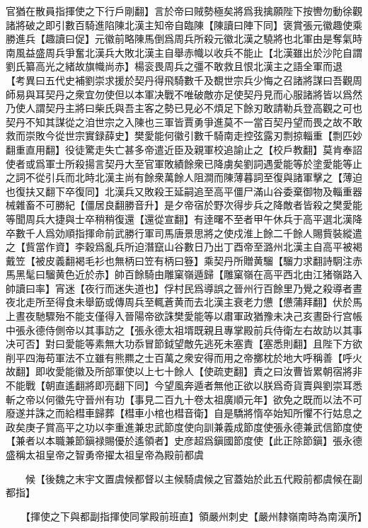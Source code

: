 官猶在散員指揮使之下行戶剛翻】言於帝曰賊勢極矣將爲我擒願陛下按轡勿動徐觀諸將破之即引數百騎進陷陳北漢主知帝自臨陳【陳讀曰陣下同】褒賞張元徽趣使乘勝進兵【趣讀曰促】元徽前略陳馬倒爲周兵所殺元徽北漢之驍將也北軍由是奪氣時南風益盛周兵爭奮北漢兵大敗北漢主自舉赤幟以收兵不能止【北漢雖出於沙陀自謂劉氏纂高光之緒故旗幟尚赤】楊衮畏周兵之彊不敢救且恨北漢主之語全軍而退　【考異曰五代史補劉崇求援於契丹得飛騎數千及覩世宗兵少悔之召諸將謀曰吾觀周師易與耳契丹之衆宜勿使但以本軍决戰不唯破敵亦足使契丹見而心服諸將皆以爲然乃使人謂契丹主將曰柴氏與吾主客之勢已見必不煩足下餘刃敢請勒兵登高觀之可也契丹不知其謀從之洎世宗之入陳也三軍皆賈勇爭進莫不一當百契丹望而畏之故不敢救而崇敗今從世宗實録薛史】樊愛能何徽引數千騎南走控弦露刃剽掠輜重【剽匹妙翻重直用翻】役徒驚走失亡甚多帝遣近臣及親軍校追諭止之【校戶教翻】莫肯奉詔使者或爲軍士所殺揚言契丹大至官軍敗績餘衆已降虜矣劉詞遇愛能等於塗愛能等止之詞不從引兵而北時北漢主尚有餘衆萬餘人阻澗而陳薄暮詞至復與諸軍擊之【薄迫也復扶又翻下卒復同】北漢兵又敗殺王延嗣追至高平僵尸滿山谷委棄御物及輜重器械雜畜不可勝紀【僵居良翻勝音升】是夕帝宿於野次得步兵之降敵者皆殺之樊愛能等聞周兵大捷與士卒稍稍復還【還從宣翻】有逹曙不至者甲午休兵于高平選北漢降卒數千人爲効順指揮命前武勝行軍司馬唐景思將之使戍淮上餘二千餘人賜貲裝縱遣之【貲當作資】李穀爲亂兵所迫潛竄山谷數日乃出丁酉帝至潞州北漢主自高平被褐戴笠【被皮義翻褐毛衫也無柄曰笠有柄曰簦】乘契丹所贈黄騮【騮力求翻詩駉注赤馬黑髦曰騮黄色近於赤】帥百餘騎由雕窠嶺遁歸【雕窠嶺在高平西北由江猪嶺路入帥讀曰率】宵迷【夜行而迷失道也】俘村民爲導誤之晉州行百餘里乃覺之殺導者晝夜北走所至得食未舉筯或傳周兵至輒蒼黄而去北漢主衰老力憊【憊蒲拜翻】伏於馬上晝夜馳驟殆不能支僅得入晉陽帝欲誅樊愛能等以肅軍政猶豫未决己亥晝卧行宫帳中張永德侍側帝以其事訪之【張永德太祖壻既親且專掌殿前兵侍衛左右故訪以其事决可否】對曰愛能等素無大功忝冒節鉞望敵先逃死未塞責【塞悉則翻】且陛下方欲削平四海苟軍法不立雖有熊羆之士百萬之衆安得而用之帝擲枕於地大呼稱善【呼火故翻】即收愛能徽及所部軍使以上七十餘人【使疏吏翻】責之曰汝曹皆累朝宿將非不能戰【朝直遙翻將即亮翻下同】今望風奔遁者無他正欲以朕爲奇貨賣與劉崇耳悉斬之帝以何徽先守晉州有功【事見二百九十卷太祖廣順元年】欲免之既而以法不可廢遂并誅之而給槥車歸葬【槥車小棺也槥音衛】自是驕將惰卒始知所懼不行姑息之政矣庚子賞高平之功以李重進兼忠武節度使向訓兼義成節度使張永德兼武信節度使【兼者以本職兼節鎭禄賜優於遙領者】史彦超爲鎭國節度使【此正除節鎭】張永德盛稱太祖皇帝之智勇帝擢太祖皇帝為殿前都虞

　　候【後魏之末宇文置虞候都督以主候騎虞候之官蓋始於此五代殿前都虞候在副都指】

　　【揮使之下與都副指揮使同掌殿前班直】領嚴州刺史【嚴州隸嶺南時為南漢所】

